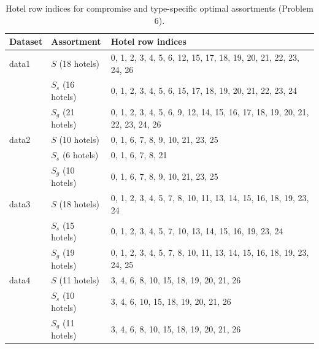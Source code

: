 \documentclass[11pt]{article}
\begin{document}
\begin{table}[h]
\centering
\begin{tabular}{lll}
\toprule
Dataset & Assortment & Hotel row indices \\
\midrule
data1 & $S$ (18 hotels)  & 0, 1, 2, 3, 4, 5, 6, 12, 15, 17, 18, 19, 20, 21, 22, 23, 24, 26 \\
      & $S_s$ (16 hotels) & 0, 1, 2, 3, 4, 5, 6, 15, 17, 18, 19, 20, 21, 22, 23, 24 \\
      & $S_g$ (21 hotels) & 0, 1, 2, 3, 4, 5, 6, 9, 12, 14, 15, 16, 17, 18, 19, 20, 21, 22, 23, 24, 26 \\
\midrule
data2 & $S$ (10 hotels)  & 0, 1, 6, 7, 8, 9, 10, 21, 23, 25 \\
      & $S_s$ (6 hotels)  & 0, 1, 6, 7, 8, 21 \\
      & $S_g$ (10 hotels) & 0, 1, 6, 7, 8, 9, 10, 21, 23, 25 \\
\midrule
data3 & $S$ (18 hotels)  & 0, 1, 2, 3, 4, 5, 7, 8, 10, 11, 13, 14, 15, 16, 18, 19, 23, 24 \\
      & $S_s$ (15 hotels) & 0, 1, 2, 3, 4, 5, 7, 10, 13, 14, 15, 16, 19, 23, 24 \\
      & $S_g$ (19 hotels) & 0, 1, 2, 3, 4, 5, 7, 8, 10, 11, 13, 14, 15, 16, 18, 19, 23, 24, 25 \\
\midrule
data4 & $S$ (11 hotels)  & 3, 4, 6, 8, 10, 15, 18, 19, 20, 21, 26 \\
      & $S_s$ (10 hotels) & 3, 4, 6, 10, 15, 18, 19, 20, 21, 26 \\
      & $S_g$ (11 hotels) & 3, 4, 6, 8, 10, 15, 18, 19, 20, 21, 26 \\
\bottomrule
\end{tabular}
\caption{Hotel row indices for compromise and type-specific optimal assortments (Problem 6).}
\end{table}

\begin{table}[h]
\centering
{}
\caption{Problem 6: compromise vs.\ type-specific assortments. $S_s$ is optimal for solo, $S_g$ for group. Revenues in \$.}
\end{table}
\end{document}
